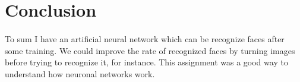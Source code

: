 \section*{Conclusion}

\paragraph{}{
    To sum I have an artificial neural network which can be recognize faces after
 some training. We could improve the rate of recognized faces by turning images
 before trying to recognize it, for instance. This assignment was a good way to
 understand how neuronal networks work.
}
